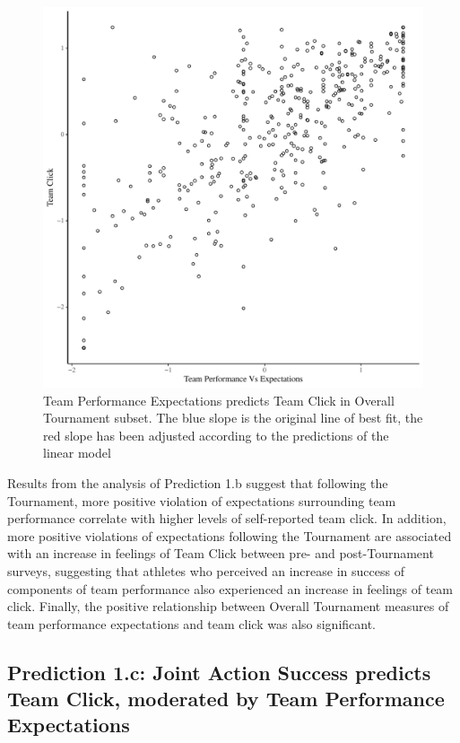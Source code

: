 \begin{landscape}
   \begin{figure}[htbp]
   \includegraphics[width = \linewidth]{images/teamPerfClickOverallBasicXY.pdf}
     \caption{Team Performance Expectations predicts Team Click in Overall Tournament subset. The blue slope is the original line of best fit, the red slope has been adjusted according to the predictions of the linear model}
     \label{fig:teamPerfClickOverallModelSlope}
   \end{figure}

Results from the analysis of Prediction 1.b suggest that following the Tournament, more positive violation of expectations surrounding team performance correlate with higher levels of self-reported team click.  In addition, more positive violations of expectations following the Tournament are associated with an increase in feelings of Team Click between pre- and post-Tournament surveys, suggesting that athletes who perceived an increase in success of components of team performance also experienced an increase in feelings of team click.  Finally, the positive relationship between Overall Tournament measures of team performance expectations and team click was also significant.




\subsection{Prediction 1.c: Joint Action Success predicts Team Click, moderated by Team Performance Expectations}


\end{landscape}
